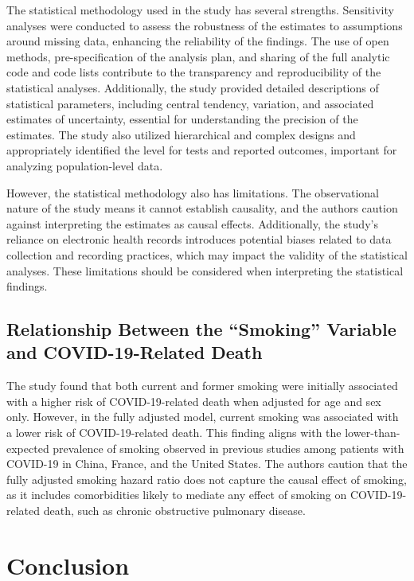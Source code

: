 \documentclass{article}
\begin{document}
The statistical methodology used in the study has several strengths. Sensitivity analyses were conducted to assess the robustness of the estimates to assumptions around missing data, enhancing the reliability of the findings. The use of open methods, pre-specification of the analysis plan, and sharing of the full analytic code and code lists contribute to the transparency and reproducibility of the statistical analyses. Additionally, the study provided detailed descriptions of statistical parameters, including central tendency, variation, and associated estimates of uncertainty, essential for understanding the precision of the estimates. The study also utilized hierarchical and complex designs and appropriately identified the level for tests and reported outcomes, important for analyzing population-level data.

However, the statistical methodology also has limitations. The observational nature of the study means it cannot establish causality, and the authors caution against interpreting the estimates as causal effects. Additionally, the study's reliance on electronic health records introduces potential biases related to data collection and recording practices, which may impact the validity of the statistical analyses. These limitations should be considered when interpreting the statistical findings.

\subsection*{Relationship Between the ``Smoking'' Variable and COVID-19-Related Death}

The study found that both current and former smoking were initially associated with a higher risk of COVID-19-related death when adjusted for age and sex only. However, in the fully adjusted model, current smoking was associated with a lower risk of COVID-19-related death. This finding aligns with the lower-than-expected prevalence of smoking observed in previous studies among patients with COVID-19 in China, France, and the United States. The authors caution that the fully adjusted smoking hazard ratio does not capture the causal effect of smoking, as it includes comorbidities likely to mediate any effect of smoking on COVID-19-related death, such as chronic obstructive pulmonary disease.

\section{Conclusion}
\end{document}
